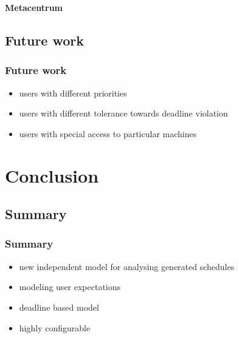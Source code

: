 {
\begin{frame}[plain]
\begin{minipage}[t][\textheight]{\textwidth}
	\color{white}\textbf{Metacentrum}
\end{minipage}
\end{frame}
}







\subsection{Future work}

\begin{frame}
	\frametitle{Future work}
	\begin{itemize}
		\item users with different priorities \pause
		\item users with different tolerance towards deadline violation \pause
		\item users with special access to particular machines
	\end{itemize}
\end{frame}

\section{Conclusion}
\subsection{Summary}

\begin{frame}
	\frametitle{Summary}
	\begin{itemize}
		\item new independent model for analysing generated schedules
		\item modeling user expectations
		\item deadline based model
		\item highly configurable
	\end{itemize}
\end{frame}


